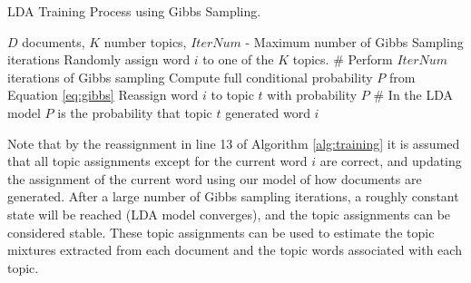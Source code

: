             \begin{algorithm}
                \caption{LDA Training Process using Gibbs Sampling.}
                \label{alg:training}
                \begin{algorithmic}[1]
                    \REQUIRE $D$ documents, $K$ number topics, $IterNum$ - Maximum number of Gibbs Sampling iterations 
                            \STATE Randomly assign word $i$ to one of the $K$ topics.
                        \ENDFOR
                    \ENDFOR
                    \STATE
                    \STATE \# Perform $IterNum$ iterations of Gibbs sampling
                                    \STATE Compute full conditional probability $P$ from Equation \ref{eq:gibbs}
                                    \STATE Reassign word $i$ to topic $t$ with probability $P$
                                    \STATE \# In the LDA model $P$ is the probability that topic $t$ generated word $i$
                                \ENDFOR
                            \ENDFOR
                        \ENDFOR
                    \ENDFOR
                \end{algorithmic}
            \end{algorithm} 
                
        Note that by the reassignment in line 13 of Algorithm \ref{alg:training} it is assumed that all topic assignments except for the current word $i$ are correct, and updating the assignment of the current word using our model of how documents are generated. After a large number of Gibbs sampling iterations, a roughly constant state will be reached (LDA model converges), and the topic assignments can be considered stable. These topic assignments can be used to estimate the topic mixtures extracted from each document and the topic words associated with each topic.
        
        
